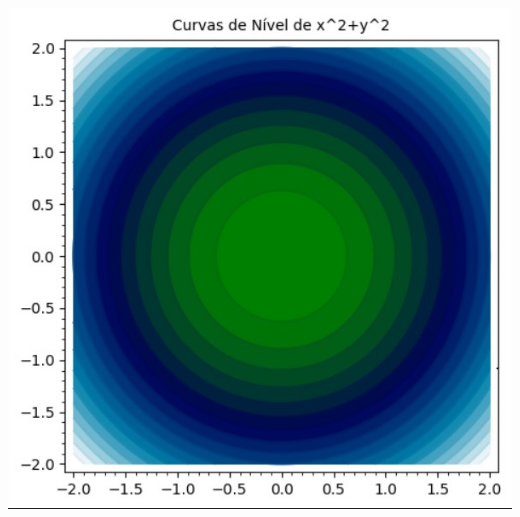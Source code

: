 \documentclass[../main.tex]{subfiles}
\begin{document}
\begin{solucao}
\begin{center}
\begin{minipage}{0.45\textwidth}
					\includegraphics[width=\textwidth]{imagens/lista03/picture_lista03_q01_item01_02.jpg}
				\end{minipage}
			\end{center}
			

\end{solucao}
\end{document}
